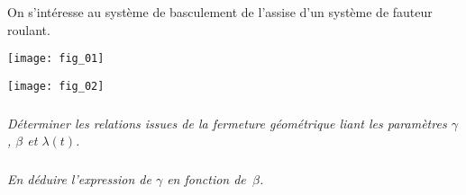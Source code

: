\setcounter{exo}{0}

On s'intéresse au système de basculement de l'assise d'un système de fauteur roulant.
\begin{center}
\texttt{[image: fig\_01]}
\end{center}

\begin{center}
\texttt{[image: fig\_02]}
\end{center}

\subparagraph{}\textit{Déterminer les relations issues de la fermeture géométrique liant les paramètres $\gamma$, $\beta$ et $\lambda(t)$.}

\subparagraph{}\textit{En déduire l'expression de $\gamma$ en fonction de~$\beta$.}
